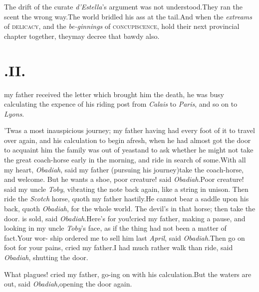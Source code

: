 \documentclass{article}
\begin{document}
The drift of the curate \textit{d’Estella}’s argument
was not understood.\tsk They ran the scent the wrong
way.\tsk The world bridled his ass at the tail.\tsk And when
the \textit{extreams} of \textsc{delicacy}, and the
\textit{be-\break ginnings} of \textsc{concupiscence}, hold their next
provincial chapter together, they\break may decree that bawdy also.

\section{.\enspace  II.}

 my father received the\break
letter which brought him the\break
{}
death, he was busy calculating the expence of
his riding post from \textit{Calais} to \textit{Paris}, and so on to
\textit{Lyons}.

\setlength{\baselineskip}{12.7826pt}  %
’Twas a most inauspicious journey; my father having had
every foot of it to travel over again, and his calculation to begin
afresh, when he had almost got
the door to acquaint him the
family was out of yeast\tsk and to ask whether he might not
take the great coach-horse\break
early in the morning, and ride in
search of some.\tsk With all my heart,
\textit{Obadiah},\break
said my father (pursuing his journey)\tsk take the
coach-horse, and welcome.\tsh
But he wants a shoe, poor creature! said
\textit{Obadiah}.\tsh Poor creature! said my uncle
\textit{Toby}, vibrating the note back again, like a string
in unison. Then ride the \textit{Scotch} horse, quoth my
father hastily.\tsk He cannot bear a saddle upon his back,
quoth \textit{Obadiah}, for the whole world.\tsh\break
The devil’s in that horse; then take\break
{}
the door.\tsh {} is sold, said\break
\textit{Obadiah}.\tsk Here’s for you!\@ cried my father,
making a pause, and looking in\break
my uncle \textit{Toby}’s face, as if the thing had\break
not been a matter of fact.\tsk Your wor- 
ship ordered me to sell him last \textit{April},\break
said \textit{Obadiah}.\tsk Then go on foot for your
pains, cried my father.\tsk I had much rather walk
than ride, said \textit{Obadiah}, shutting the door.

What plagues! cried my father, go-\break ing on with his
calculation.\tsh But the waters are out, said
\textit{Obadiah},\tsk opening the door again.
\end{document}
